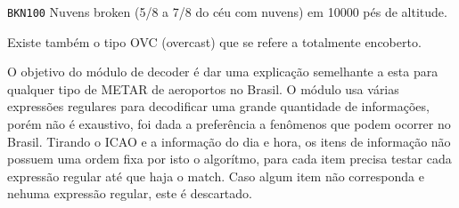 \texttt{BKN100} Nuvens broken (5/8 a 7/8 do céu com nuvens) em 10000 pés de altitude.

Existe também o tipo OVC (overcast) que se refere a totalmente encoberto.

O objetivo do módulo de decoder é dar uma explicação semelhante a esta para qualquer tipo de METAR
de aeroportos no Brasil. O módulo usa várias expressões regulares para decodificar uma grande quantidade de informações,
porém não é exaustivo, foi dada a preferência a fenômenos que podem ocorrer no Brasil. Tirando o ICAO e a informação
do dia e hora, os itens de informação não possuem uma ordem fixa por isto o algorítmo, para cada item
precisa testar cada expressão regular até que haja o match. Caso algum item não corresponda e nehuma
expressão regular, este é descartado.
